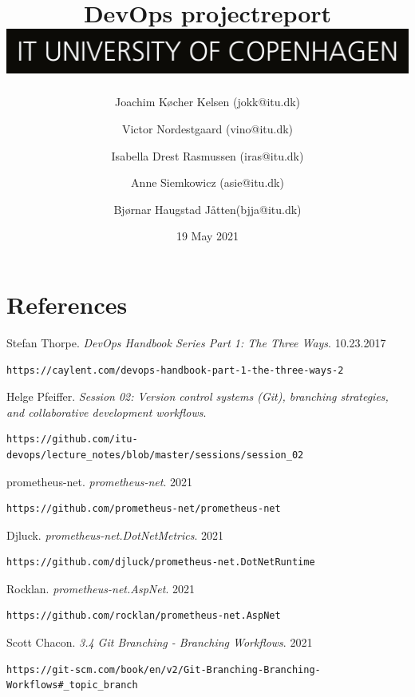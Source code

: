 \documentclass{article}
\title{DevOps projectreport \\[2ex] \includegraphics[scale=0.1]{images/ITU_logo_UK.jpg}}
\author{Joachim Køcher Kelsen (jokk@itu.dk) \and Victor Nordestgaard (vino@itu.dk) \and Isabella Drest Rasmussen (iras@itu.dk) \and Anne Siemkowicz (asie@itu.dk) \and Bjørnar Haugstad Jåtten(bjja@itu.dk)}
\date{19 May 2021}
\begin{document}
{}

\maketitle

\newpage

\tableofcontents

\newpage



\newpage



\newpage



\newpage



\newpage

\section{References}
\begin{thebibliography}{9}
Stefan Thorpe.
\textit{DevOps Handbook Series Part 1: The Three Ways}. 
10.23.2017
\begin{verbatim}
https://caylent.com/devops-handbook-part-1-the-three-ways-2
\end{verbatim}

Helge Pfeiffer. 
\textit{Session 02: Version control systems (Git), branching strategies, and collaborative development workflows}. 
\begin{verbatim}
https://github.com/itu-devops/lecture_notes/blob/master/sessions/session_02
\end{verbatim}

prometheus-net. \textit{prometheus-net}. 2021
\begin{verbatim}
https://github.com/prometheus-net/prometheus-net
\end{verbatim}

Djluck. \textit{prometheus-net.DotNetMetrics}. 2021
\begin{verbatim}
https://github.com/djluck/prometheus-net.DotNetRuntime
\end{verbatim}

Rocklan. \textit{prometheus-net.AspNet}. 2021
\begin{verbatim}
https://github.com/rocklan/prometheus-net.AspNet
\end{verbatim}

Scott Chacon. \textit{3.4 Git Branching - Branching Workflows}. 2021
\begin{verbatim}
https://git-scm.com/book/en/v2/Git-Branching-Branching-Workflows#_topic_branch
\end{verbatim}

\end{thebibliography}
\end{document}
